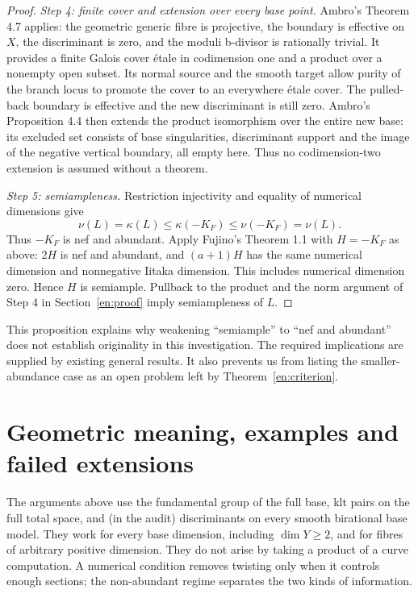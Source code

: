 \documentclass[12pt]{amsart}
\theoremstyle{definition}
\theoremstyle{remark}
\numberwithin{equation}{section}
\begin{document}
\begin{proof}
\textit{Step 4: finite cover and extension over every base point.}
Ambro's Theorem 4.7 applies: the geometric generic fibre is projective, the boundary is effective on $X$, the discriminant is zero, and the moduli b-divisor is rationally trivial. It provides a finite Galois cover \'etale in codimension one and a product over a nonempty open subset. Its normal source and the smooth target allow purity of the branch locus \cite[Tag 0BMB]{en:Stacks} to promote the cover to an everywhere \'etale cover. The pulled-back boundary is effective and the new discriminant is still zero. Ambro's Proposition 4.4 then extends the product isomorphism over the entire new base: its excluded set consists of base singularities, discriminant support and the image of the negative vertical boundary, all empty here. Thus no codimension-two extension is assumed without a theorem.

\textit{Step 5: semiampleness.}
Restriction injectivity and equality of numerical dimensions give
\[
 \nu(L)=\kappa(L)\leq\kappa(-K_F)\leq\nu(-K_F)=\nu(L).
\]
Thus $-K_F$ is nef and abundant. Apply Fujino's Theorem 1.1 with $H=-K_F$ as above: $2H$ is nef and abundant, and $(a+1)H$ has the same numerical dimension and nonnegative Iitaka dimension. This includes numerical dimension zero. Hence $H$ is semiample. Pullback to the product and the norm argument of Step 4 in Section~\ref{en:proof} imply semiampleness of $L$.
\end{proof}

This proposition explains why weakening ``semiample'' to ``nef and abundant'' does not establish originality in this investigation. The required implications are supplied by existing general results. It also prevents us from listing the smaller-abundance case as an open problem left by Theorem~\ref{en:criterion}.

\section{Geometric meaning, examples and failed extensions}\label{en:examples}
The arguments above use the fundamental group of the full base, klt pairs on the full total space, and (in the audit) discriminants on every smooth birational base model. They work for every base dimension, including $\dim Y\geq2$, and for fibres of arbitrary positive dimension. They do not arise by taking a product of a curve computation. A numerical condition removes twisting only when it controls enough sections; the non-abundant regime separates the two kinds of information.
\end{document}
